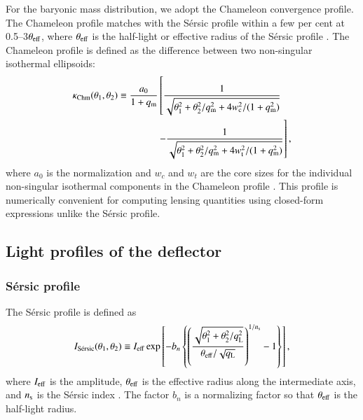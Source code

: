 \documentclass[longauth]{aa}
\newcommand{\ajs}[1]{{{#1}}}
\newcommand{\suyu}[1]{{{#1}}}
\begin{document}
For the baryonic mass distribution, we adopt the Chameleon convergence profile. The Chameleon profile matches with the S\'ersic profile within a few per cent at 0.5--3$\theta_{\rm eff}$, where $\theta_{\rm eff}$ is the half-light or effective radius of the S\'ersic profile \citep{Dutton11}. The Chameleon profile is defined as the difference between two non-singular isothermal ellipsoids:
%
\begin{equation} \label{eq:chameleon}
        \begin{split}
        \kappa_{\rm Chm} (\theta_1, \theta_2) &\equiv \frac{a_0}{1 + q_{\rm m}} \left[ \frac{1}{\sqrt{\theta_1^2+\theta_2^2/q_{\rm m}^2 + 4w_{\rm c}^2/(1+q_{\rm m}^2)}} \right. \\
         & \quad \quad \quad \quad \left. - \frac{1}{\sqrt{\theta_1^2+\theta_2^2/q_{\rm m}^2 + 4w_{\rm t}^2/(1+q_{\rm m}^2)}} \right],
\end{split}
\end{equation}
%
where \ajs{$a_0$ is the normalization and $w_c$ and $w_t$ are the core sizes for the individual non-singular isothermal components in the Chameleon profile} \citep{Dutton11, Suyu14}. This profile is numerically convenient for computing lensing quantities using closed-form expressions unlike the S\'ersic profile.  %




\subsection{Light profiles of the deflector}

\subsubsection{S\'ersic profile}

The S\'ersic profile is defined as
%
\begin{equation}
        I_{\text{S\'ersic}} (\theta_1, \theta_2) \equiv I_{\rm eff} \exp \left[-b_n \left\{\left(\frac{\sqrt{\theta_1^2 + \theta_2^2/q_{\rm L}^2}}{\theta_{\rm eff}/\sqrt{q_{\rm L}}} \right)^{1/n_{\rm s}} - 1 \right\} \right],
\end{equation}
%
where $I_{\rm eff}$ is the amplitude, $\theta_{\rm eff}$ is the effective radius \ajs{along the intermediate axis}, and $n_{\rm s}$ is the S\'ersic index \citep{Sersic68}. The factor $b_n$ is a normalizing factor so that $\theta_{\rm eff}$ is the half-light radius.
\end{document}
